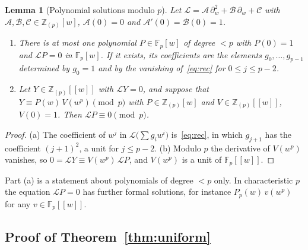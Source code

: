 \documentclass[11pt,a4paper]{article}
\newtheorem{lemma}[theorem]{Lemma}
\theoremstyle{definition}
\theoremstyle{remark}
\newcommand{\F}{\mathbb{F}}
\newcommand{\Z}{\mathbb{Z}}
\newcommand{\Zp}{\Z_{(p)}}
\newcommand{\cL}{\mathcal{L}}
\newcommand{\cA}{\mathcal{A}}
\newcommand{\cB}{\mathcal{B}}
\newcommand{\cC}{\mathcal{C}}
\newcommand{\dw}{\partial_w}
\numberwithin{equation}{section}
\begin{document}
\begin{lemma}[Polynomial solutions modulo $p$]\label{lem:modp}
Let $\cL=\cA\,\dw^2+\cB\,\dw+\cC$ with $\cA,\cB,\cC\in\Zp[w]$, $\cA(0)=0$ and
$\cA'(0)=\cB(0)=1$.
\begin{enumerate}
\item[(a)] There is at most one polynomial $P\in\F_p[w]$ of degree $<p$ with
$P(0)=1$ and $\cL P=0$ in $\F_p[w]$. If it exists, its coefficients are the
elements $g_0,\dots,g_{p-1}$ determined by $g_0=1$ and by the vanishing
of~\eqref{eq:rec} for $0\le j\le p-2$.
\item[(b)] Let $Y\in\Zp[[w]]$ with $\cL Y=0$, and suppose that
$Y\equiv P(w)\,V(w^p)\pmod p$ with $P\in\Zp[w]$ and $V\in\Zp[[w]]$, $V(0)=1$.
Then $\cL P\equiv0\pmod p$.
\end{enumerate}
\end{lemma}
\begin{proof}
(a) The coefficient of $w^j$ in $\cL\bigl(\sum g_iw^i\bigr)$
is~\eqref{eq:rec}, in which $g_{j+1}$ has the coefficient $(j+1)^2$, a unit
for $j\le p-2$.
(b) Modulo $p$ the derivative of $V(w^p)$ vanishes, so
$0=\cL Y\equiv V(w^p)\,\cL P$, and $V(w^p)$ is a unit of $\F_p[[w]]$.
\end{proof}

Part (a) is a statement about polynomials of degree $<p$ only. In
characteristic $p$ the equation $\cL P=0$ has further formal solutions, for
instance $P_p(w)\,v(w^p)$ for any $v\in\F_p[[w]]$.

\subsection{Proof of Theorem~\ref{thm:uniform}}
\end{document}
